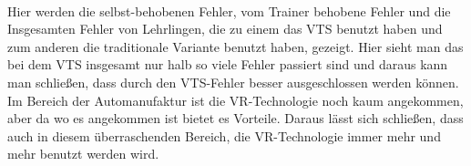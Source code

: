 \\
Hier werden die selbst-behobenen Fehler, vom Trainer behobene Fehler und die Insgesamten Fehler von Lehrlingen, die zu einem das VTS benutzt haben und zum anderen die traditionale Variante benutzt haben, gezeigt. Hier sieht man das bei dem VTS insgesamt nur halb so viele Fehler passiert sind und daraus kann man schließen, dass durch den VTS-Fehler besser ausgeschlossen werden können\cite{langley2016establishing}.
Im Bereich der Automanufaktur ist die VR-Technologie noch kaum angekommen, aber da wo es angekommen ist bietet es Vorteile. Daraus lässt sich schließen, dass auch in diesem überraschenden Bereich, die VR-Technologie immer mehr und mehr benutzt werden wird.
